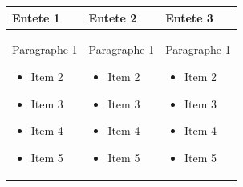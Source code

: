 \documentclass[11pt,a4paper]{article}
\begin{document}
\begin{table}[h]
\begin{tabular}{|l|l|l|}
\hline
Entete 1 & Entete 2 & Entete 3 \\ \hline
Paragraphe 1  \begin{itemize} \item Item 2 \item Item 3 \item Item 4 \item Item 5 \end{itemize} & Paragraphe 1  \begin{itemize} \item Item 2 \item Item 3 \item Item 4 \item Item 5 \end{itemize} & Paragraphe 1  \begin{itemize} \item Item 2 \item Item 3 \item Item 4 \item Item 5 \end{itemize} \\ \hline
\end{tabular}
\end{table}
\end{document}
